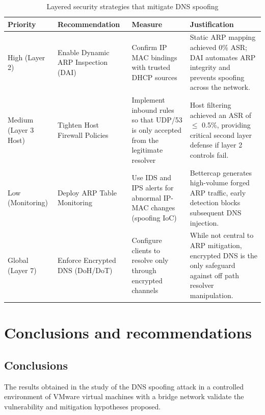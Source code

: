 \documentclass[conference]{IEEEtran}
\begin{document}
\renewcommand{\arraystretch}{1.4} %
\begin{table}[htbp]
\caption{Layered security strategies that mitigate DNS spoofing}
\label{tab:layeredstrategy}
\begin{center}
\begin{tabular}{@{}p{3cm} p{3cm} p{4cm} p{5cm}@{}} \hline
\textbf{Priority} & \textbf{Recommendation} & \textbf{Measure} & \textbf{Justification} \\ \hline

High (Layer 2) &
Enable Dynamic ARP Inspection (DAI) &
Confirm IP MAC bindings with trusted DHCP sources &
Static ARP mapping achieved 0\% ASR; DAI automates ARP integrity and prevents spoofing across the network. \\ \hline

Medium (Layer 3 Host) &
Tighten Host Firewall Policies &
Implement inbound rules so that UDP/53 is only accepted from the legitimate resolver &
Host filtering achieved an ASR of $\leq$ 0.5\%, providing critical second layer defense if layer 2 controls fail. \\ \hline

Low (Monitoring) &
Deploy ARP Table Monitoring &
Use IDS and IPS alerts for abnormal IP-MAC changes (spoofing IoC) &
Bettercap generates high-volume forged ARP traffic, early detection blocks subsequent DNS injection. \\ \hline

Global (Layer 7) &
Enforce Encrypted DNS (DoH/DoT) &
Configure clients to resolve only through encrypted channels &
While not central to ARP mitigation, encrypted DNS is the only safeguard against off path resolver manipulation. \\ \hline

\end{tabular}
\end{center}
\end{table}




\section{Conclusions and recommendations}
\subsection{Conclusions}
The results obtained in the study of the DNS spoofing attack in a controlled environment of VMware virtual machines with a bridge network validate the vulnerability and mitigation hypotheses proposed.
\end{document}
